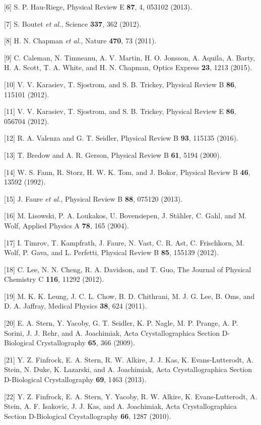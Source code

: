 {[}6{]} S. P. Hau-Riege, Physical Review E \textbf{87}, 4, 053102
(2013).

{[}7{]} S. Boutet \emph{et al.}, Science \textbf{337}, 362 (2012).

{[}8{]} H. N. Chapman \emph{et al.}, Nature \textbf{470}, 73 (2011).

{[}9{]} C. Caleman, N. Timneanu, A. V. Martin, H. O. Jonsson, A. Aquila,
A. Barty, H. A. Scott, T. A. White, and H. N. Chapman, Optics Express
\textbf{23}, 1213 (2015).

{[}10{]} V. V. Karasiev, T. Sjostrom, and S. B. Trickey, Physical Review
B \textbf{86}, 115101 (2012).

{[}11{]} V. V. Karasiev, T. Sjostrom, and S. B. Trickey, Physical Review
E \textbf{86}, 056704 (2012).

{[}12{]} R. A. Valenza and G. T. Seidler, Physical Review B \textbf{93},
115135 (2016).

{[}13{]} T. Bredow and A. R. Gerson, Physical Review B \textbf{61}, 5194
(2000).

{[}14{]} W. S. Fann, R. Storz, H. W. K. Tom, and J. Bokor, Physical
Review B \textbf{46}, 13592 (1992).

{[}15{]} J. Faure \emph{et al.}, Physical Review B \textbf{88}, 075120
(2013).

{[}16{]} M. Lisowski, P. A. Loukakos, U. Bovensiepen, J. Stähler, C.
Gahl, and M. Wolf, Applied Physics A \textbf{78}, 165 (2004).

{[}17{]} I. Timrov, T. Kampfrath, J. Faure, N. Vast, C. R. Ast, C.
Frischkorn, M. Wolf, P. Gava, and L. Perfetti, Physical Review B
\textbf{85}, 155139 (2012).

{[}18{]} C. Lee, N. N. Cheng, R. A. Davidson, and T. Guo, The Journal of
Physical Chemistry C \textbf{116}, 11292 (2012).

{[}19{]} M. K. K. Leung, J. C. L. Chow, B. D. Chithrani, M. J. G. Lee,
B. Oms, and D. A. Jaffray, Medical Physics \textbf{38}, 624 (2011).

{[}20{]} E. A. Stern, Y. Yacoby, G. T. Seidler, K. P. Nagle, M. P.
Prange, A. P. Sorini, J. J. Rehr, and A. Joachimiak, Acta
Crystallographica Section D-Biological Crystallography \textbf{65}, 366
(2009).

{[}21{]} Y. Z. Finfrock, E. A. Stern, R. W. Alkire, J. J. Kas, K.
Evans-Lutterodt, A. Stein, N. Duke, K. Lazarski, and A. Joachimiak, Acta
Crystallographica Section D-Biological Crystallography \textbf{69}, 1463
(2013).

{[}22{]} Y. Z. Finfrock, E. A. Stern, Y. Yacoby, R. W. Alkire, K.
Evans-Lutterodt, A. Stein, A. F. Isakovic, J. J. Kas, and A. Joachimiak,
Acta Crystallographica Section D-Biological Crystallography \textbf{66},
1287 (2010).

